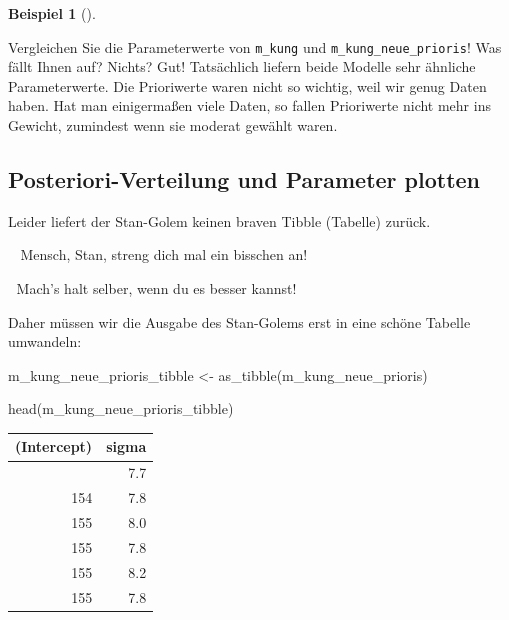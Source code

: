 \documentclass[
  ngerman,
  letterpaper,
  twoside,
  open=any]{scrbook}
\newenvironment{Shaded}{\begin{snugshade}}{\end{snugshade}}
\newcommand{\FunctionTok}[1]{\textcolor[rgb]{0.28,0.35,0.67}{#1}}
\newcommand{\NormalTok}[1]{\textcolor[rgb]{0.00,0.23,0.31}{#1}}
\newcommand{\OtherTok}[1]{\textcolor[rgb]{0.00,0.23,0.31}{#1}}
\newcounter{none} %
\theoremstyle{definition}
\newtheorem{example}{Beispiel}[chapter]
\theoremstyle{plain}
\theoremstyle{definition}
\theoremstyle{definition}
\theoremstyle{remark}
\begin{document}
\begin{example}[]
\begin{tcolorbox}
Vergleichen Sie die Parameterwerte von \texttt{m\_kung} und
\texttt{m\_kung\_neue\_prioris}! Was fällt Ihnen auf? Nichts? Gut!
Tatsächlich liefern beide Modelle sehr ähnliche Parameterwerte. Die
Prioriwerte waren nicht so wichtig, weil wir genug Daten haben. Hat man
einigermaßen viele Daten, so fallen Prioriwerte nicht mehr ins Gewicht,
zumindest wenn sie moderat gewählt waren.

\end{tcolorbox}

\subsection{Posteriori-Verteilung und Parameter
plotten}\label{posteriori-verteilung-und-parameter-plotten}

Leider liefert der Stan-Golem keinen braven Tibble (Tabelle) zurück.

\begin{displayquote}
👨🏫 Mensch, Stan, streng dich mal ein bisschen an!
\end{displayquote}

\begin{displayquote}
🤖 Mach's halt selber, wenn du es besser kannst!
\end{displayquote}

Daher müssen wir die Ausgabe des Stan-Golems erst in eine schöne Tabelle
umwandeln:

\begin{Shaded}
\begin{Highlighting}[]
\NormalTok{m\_kung\_neue\_prioris\_tibble }\OtherTok{\textless{}{-}}
  \FunctionTok{as\_tibble}\NormalTok{(m\_kung\_neue\_prioris)}

\FunctionTok{head}\NormalTok{(m\_kung\_neue\_prioris\_tibble)}
\end{Highlighting}
\end{Shaded}

{\def\LTcaptype{none} %
\begin{longtable}[]{@{}rr@{}}
\toprule\noalign{}
(Intercept) & sigma \\
\midrule\noalign{}
\endhead
\bottomrule\noalign{}
\endlastfoot
155 & 7.7 \\
154 & 7.8 \\
155 & 8.0 \\
155 & 7.8 \\
155 & 8.2 \\
155 & 7.8 \\
\end{longtable}
}


\end{example}
\end{document}
